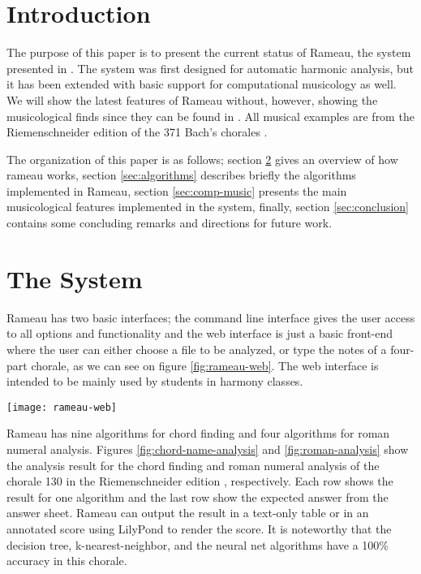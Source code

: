 \section{Introduction}

The purpose of this paper is to present the current status of Rameau,
the system presented in \cite{kroger08:rameau}. The system was first
designed for automatic harmonic analysis, but it has been extended
with basic support for computational musicology as well. We will show
the latest features of Rameau without, however, showing the
musicological finds since they can be found in
\cite{kroger08:musicologia}. All musical examples are from the
Riemenschneider edition of the 371 Bach's chorales \cite{bach41:371}.

The organization of this paper is as follows; section \ref{sec:system}
gives an overview of how rameau works, section \ref{sec:algorithms}
describes briefly the algorithms implemented in Rameau, section
\ref{sec:comp-music} presents the main musicological features
implemented in the system, finally, section \ref{sec:conclusion}
contains some concluding remarks and directions for future work.

\section{The System}
\label{sec:system}

Rameau has two basic interfaces; the command line interface gives the
user access to all options and functionality and the web interface is
just a basic front-end where the user can either choose a file to be
analyzed, or type the notes of a four-part chorale, as we can see on
figure \ref{fig:rameau-web}. The web interface is intended to be
mainly used by students in harmony classes.

\begin{figure*}
  \centering
  \texttt{[image: rameau-web]}
  \caption{Rameau's web interface}
  \label{fig:rameau-web}
\end{figure*}

Rameau has nine algorithms for chord finding and four algorithms for
roman numeral analysis. Figures \ref{fig:chord-name-analysis} and
\ref{fig:roman-analysis} show the analysis result for the chord
finding and roman numeral analysis of the chorale 130 in the
Riemenschneider edition \cite{bach41:371} , respectively. Each row
shows the result for one algorithm and the last row show the expected
answer from the answer sheet. Rameau can output the result in a
text-only table or in an annotated score using LilyPond
\cite{nienhuys.ea08:LilyPond} to render the score. It is noteworthy
that the decision tree, k-nearest-neighbor, and the neural net
algorithms have a 100\% accuracy in this chorale.

